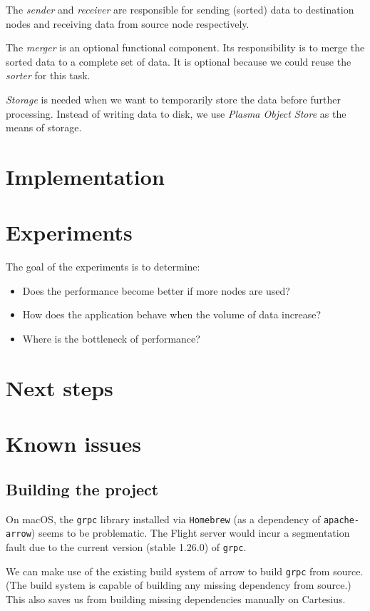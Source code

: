 \documentclass{article}
\begin{document}
The \textit{sender} and \textit{receiver} are responsible for sending (sorted) data to destination nodes and receiving data from source node respectively.

The \textit{merger} is an optional functional component.
Its responsibility is to merge the sorted data to a complete set of data.
It is optional because we could reuse the \textit{sorter} for this task.

\textit{Storage} is needed when we want to temporarily store the data before further processing.
Instead of writing data to disk, we use \textit{Plasma Object Store} as the means of storage.

\section{Implementation}

\section{Experiments}
The goal of the experiments is to determine:
\begin{itemize}
    \item Does the performance become better if more nodes are used?
    \item How does the application behave when the volume of data increase?
    \item Where is the bottleneck of performance?
\end{itemize}

\section{Next steps}

\appendix
\section{Known issues}
\subsection{Building the project}

On macOS, the \texttt{grpc} library installed via \texttt{Homebrew} (as a dependency of \texttt{apache-arrow}) seems to be problematic.
The Flight server would incur a segmentation fault due to the current version (stable 1.26.0) of \texttt{grpc}.

We can make use of the existing build system of arrow to build \texttt{grpc} from source.
(The build system is capable of building any missing dependency from source.)
This also saves us from building missing dependencies manually on Cartesius.
\end{document}
